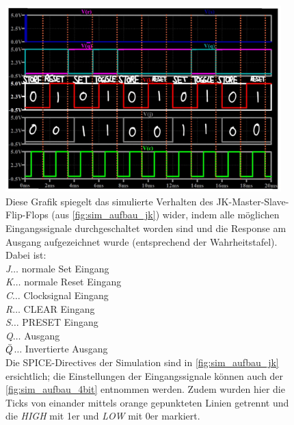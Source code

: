 \documentclass[12pt,english,ngerman]{scrartcl}
\begin{document}
\begin{figure}[H]
  \centering
    \includegraphics[width=0.95\textwidth]{./figures/sim/jk/auswertungjk.jpg}
  \caption{
Diese Grafik spiegelt das simulierte Verhalten des JK-Master-Slave-Flip-Flops (aus
    \autoref{fig:sim_aufbau_jk}) wider, indem alle möglichen Eingangssignale
    durchgeschaltet worden sind und die Response am Ausgang aufgezeichnet
    wurde (entsprechend der Wahrheitstafel). 
    Dabei ist:\\
    \textit{J}$\dots$ normale Set Eingang\\
    \textit{K}$\dots$ normale Reset Eingang\\
    \textit{C}$\dots$ Clocksignal Eingang\\
    \textit{R}$\dots$ CLEAR Eingang\\
    \textit{S}$\dots$ PRESET Eingang\\
    \textit{Q}$\dots$ Ausgang\\
    \textit{$\Bar{Q}$}$\dots$ Invertierte Ausgang\\
    Die SPICE-Directives der Simulation sind in \autoref{fig:sim_aufbau_jk}
    ersichtlich; die Einstellungen der Eingangssignale können auch der \autoref{fig:sim_aufbau_4bit}
  entnommen werden. Zudem wurden hier die Ticks von einander mittels orange gepunkteten Linien getrennt und die \textit{HIGH} mit 1er und \textit{LOW} mit 0er markiert.}
  \label{fig:sim_alarm_wahrheit_aus}
\end{figure}

\end{document}

